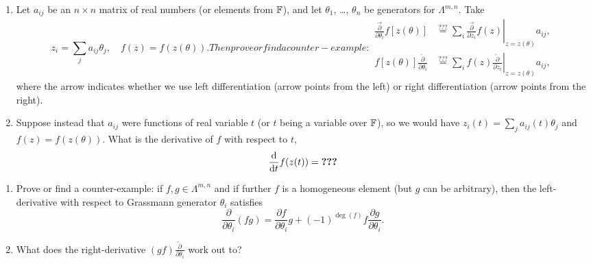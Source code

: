 \begin{exercise}
  \begin{enumerate}
  \item  Let $a_{ij}$ be an $n\times n$ matrix of real numbers (or elements
  from $\mathbb{F}$), and let $\theta_{1}$, \dots, $\theta_{n}$ be generators
  for $\Lambda^{m,n}$. Take
\begin{subequations}
  \begin{equation}
z_{i} = \sum_{j}a_{ij}\theta_{j},\quad f(z)=f(z(\theta)).
  \end{equation}
  Then prove or find a counter-example:
  \begin{align}
    \frac{\overrightarrow{\partial}}{\partial\theta_{i}}f[z(\theta)] &\stackrel{???}{=} \sum_{i}\left.\frac{\overrightarrow{\partial}}{\partial z_{i}}f(z)\right|_{z=z(\theta)}a_{ij},\\
    f[z(\theta)]\frac{\overleftarrow{\partial}}{\partial\theta_{i}} &\stackrel{???}{=} \sum_{i}\left.f(z)\frac{\overleftarrow{\partial}}{\partial z_{i}}\right|_{z=z(\theta)}a_{ij},
  \end{align}
\end{subequations}
where the arrow indicates whether we use left differentiation (arrow
points from the left) or right differentiation (arrow points from the right).
\item Suppose instead that $a_{ij}$ were functions of real variable $t$ (or
  $t$ being a variable over $\mathbb{F}$), so we would have $z_{i}(t) = \sum_{j}a_{ij}(t)\theta_{j}$
  and $f(z) = f(z(\theta))$. What is the derivative of $f$ with respect
  to $t$,
  \begin{equation*}
\frac{\mathrm{d}}{\mathrm{d} t}f(z(t)) = \hbox{\bfseries ???}
  \end{equation*}
\end{enumerate}
\end{exercise}

\begin{exercise}
  \begin{enumerate}
  \item  Prove or find a counter-example: if $f,g\in\Lambda^{m,n}$ and if
  further $f$ is a homogeneous element (but $g$ can be arbitrary), then
  the left-derivative with respect to Grassmann generator $\theta_{i}$ satisfies
  \begin{equation}
\frac{\partial}{\partial\theta_{i}}(fg) = \frac{\partial f}{\partial\theta_{i}}g+(-1)^{\deg(f)}f\frac{\partial g}{\partial\theta_{i}}.
  \end{equation}
\item What does the right-derivative $(gf)\frac{\overleftarrow{\partial}}{\partial\theta_{i}}$
  work out to?
  \end{enumerate}
\end{exercise}

